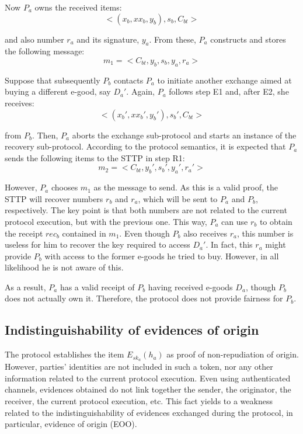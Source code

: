 \documentclass{article}
\begin{document}
Now $P_a$ owns the received items:
\begin{displaymath}
<(x_b, xx_b, y_b), s_b, C_{bt}>
\end{displaymath}

\noindent and also number $r_a$ and its signature, $y_a$. From
these, $P_a$ constructs and stores the following message:
\begin{displaymath}
m_1 = <C_{bt}, y_b, s_b, y_a, r_a>
\end{displaymath}

Suppose that subsequently $P_b$ contacts $P_a$ to initiate another
exchange aimed at buying a different e-good, say $D_a'$. Again,
$P_a$ follows step E1 and, after E2, she receives:
\begin{displaymath}
<(x_b', xx_b', y_b'), s_b', C_{bt}>
\end{displaymath}

\noindent from $P_b$. Then, $P_a$ aborts the exchange sub-protocol
and starts an instance of the recovery sub-protocol. According to
the protocol semantics, it is expected that $P_a$ sends the
following items to the STTP in step R1:
\begin{displaymath}
m_2 = <C_{bt}, y_b', s_b', y_a', r_a'>
\end{displaymath}

\noindent However, $P_a$ chooses $m_1$ as the message to send. As
this is a valid proof, the STTP will recover numbers $r_b$ and
$r_a$, which will be sent to $P_a$ and $P_b$, respectively. The key
point is that both numbers are not related to the current protocol
execution, but with the previous one. This way, $P_a$ can use $r_b$
to obtain the receipt $rec_b$ contained in $m_1$. Even though $P_b$
also receives $r_a$, this number is useless for him to recover the
key required to access $D_a'$. In fact, this $r_a$ might provide
$P_b$ with access to the former e-goods he tried to buy. However, in
all likelihood he is not aware of this.

As a result, $P_a$ has a valid receipt of $P_b$ having received
e-goods $D_a$, though $P_b$ does not actually own it. Therefore, the
protocol does not provide fairness for $P_b$.


\subsection{Indistinguishability of evidences of origin}\label{Sec:EOO}
The protocol establishes the item $E_{sk_a}(h_a)$ as proof of
non-repudiation of origin. However, parties' identities are not
included in such a token, nor any other information related to the
current protocol execution. Even using authenticated channels,
evidences obtained do not link together the sender, the originator,
the receiver, the current protocol execution, etc. This fact yields
to a weakness related to the indistinguishability of evidences
exchanged during the protocol, in particular, evidence of origin
(EOO).
\end{document}
